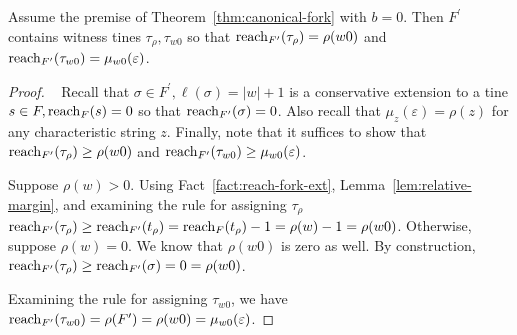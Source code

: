 
	\begin{proposition}\label{prop:optadv-tau-rho}
		Assume the premise of Theorem~\ref{thm:canonical-fork} with $b = 0$.
		Then $F^\prime$ contains witness tines $\tau_\rho, \tau_{w0}$ 
		so that 
		$\operatorname{reach}_{F^\prime}(\tau_\rho) = \rho(w0)$ and 
		$\operatorname{reach}_{F^\prime}(\tau_{w0}) = \mu_{w 0}(\varepsilon)$. 
	\end{proposition}
	\begin{proof}~
		Recall that $\sigma \in F^\prime, \ell(\sigma) = |w| + 1$ 
		is a conservative extension to 
		a tine $s \in F, \operatorname{reach}_F(s) = 0$ 
		so that $\operatorname{reach}_{F^\prime}(\sigma) = 0$. 
		Also recall that $\mu_z(\varepsilon) = \rho(z)$ for any characteristic string $z$. 
		Finally, note that it suffices to show that 
		$\operatorname{reach}_{F^\prime}(\tau_\rho) \geq \rho(w0)$ and 
		$\operatorname{reach}_{F^\prime}(\tau_{w0}) \geq \mu_{w 0}(\varepsilon)$. 


				Suppose $\rho(w) > 0$. 
				Using Fact~\ref{fact:reach-fork-ext}, Lemma~\ref{lem:relative-margin}, 
				and examining the rule for assigning $\tau_\rho$
				$\operatorname{reach}_{F^\prime}(\tau_\rho) 
				\geq \operatorname{reach}_{F^\prime}(t_\rho) 
				= \operatorname{reach}_F(t_\rho) - 1 
				= \rho(w) - 1 
				 = \rho(w0)
				$. 
				Otherwise, suppose $\rho(w) = 0$.
				We know that $\rho(w0)$ is zero as well. 
				By construction, 
				$\operatorname{reach}_{F^\prime}(\tau_\rho) 
				\geq \operatorname{reach}_{F^\prime}(\sigma) 
				= 0 = \rho(w0)
				$. 

		Examining the rule for assigning $\tau_{w0}$, we have 
		$\operatorname{reach}_{F^\prime}(\tau_{w0}) = \rho(F^\prime) 
		= \rho(w0) = \mu_{w0}(\varepsilon)$. 	
	\end{proof}



